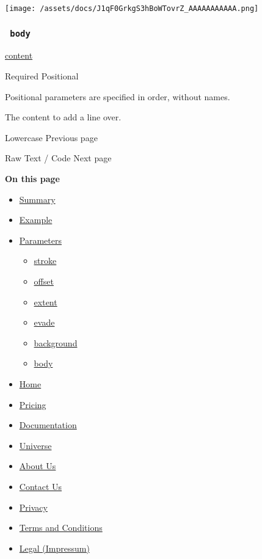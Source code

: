 \texttt{[image: /assets/docs/J1qF0GrkgS3hBoWTovrZ\_AAAAAAAAAAA.png]}

\subsubsection{\texorpdfstring{\texttt{\ body\ }}{ body }}\label{parameters-body}

\href{/docs/reference/foundations/content/}{content}

{Required} {{ Positional }}

\label{parameters-body-positional-tooltip}
Positional parameters are specified in order, without names.

The content to add a line over.

\href{/docs/reference/text/lower/}{\pandocbounded{}}

{ Lowercase } { Previous page }

\href{/docs/reference/text/raw/}{\pandocbounded{}}

{ Raw Text / Code } { Next page }

\textbf{On this page}

\begin{itemize}
\tightlist
\item
  \hyperref[summary]{Summary}
\item
  \hyperref[example]{Example}
\item
  \hyperref[parameters]{Parameters}

  \begin{itemize}
  \tightlist
  \item
    \hyperref[parameters-stroke]{stroke}
  \item
    \hyperref[parameters-offset]{offset}
  \item
    \hyperref[parameters-extent]{extent}
  \item
    \hyperref[parameters-evade]{evade}
  \item
    \hyperref[parameters-background]{background}
  \item
    \hyperref[parameters-body]{body}
  \end{itemize}
\end{itemize}

\begin{itemize}
\tightlist
\item
  \href{/}{Home}
\item
  \href{/pricing/}{Pricing}
\item
  \href{/docs/}{Documentation}
\item
  \href{/universe/}{Universe}
\item
  \href{/about/}{About Us}
\item
  \href{/contact/}{Contact Us}
\item
  \href{/privacy/}{Privacy}
\item
  \href{https://typst.app/terms}{Terms and Conditions}
\item
  \href{/legal/}{Legal (Impressum)}
\end{itemize}

